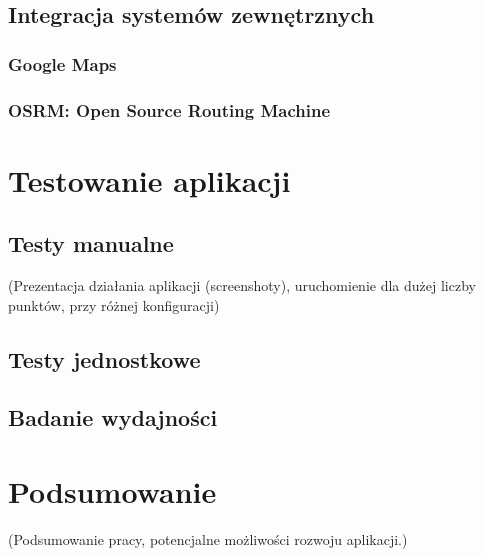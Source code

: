 \documentclass[12pt,a4paper]{report}
\begin{document}
		\section{Integracja systemów zewnętrznych}
			
			\subsection{Google Maps}
				
			\subsection{OSRM: Open Source Routing Machine}
				
	\chapter{Testowanie aplikacji}
	\section{Testy manualne}
	(Prezentacja działania aplikacji (screenshoty), uruchomienie dla dużej liczby punktów, przy różnej konfiguracji)
	\section{Testy jednostkowe}
		\label{sec:testy_jednostkowe}
		
	\section{Badanie wydajności}\label{sec:wydajnosc}
	
	\chapter*{Podsumowanie}
		(Podsumowanie pracy, potencjalne możliwości rozwoju aplikacji.)
		
	
	
\end{document}
